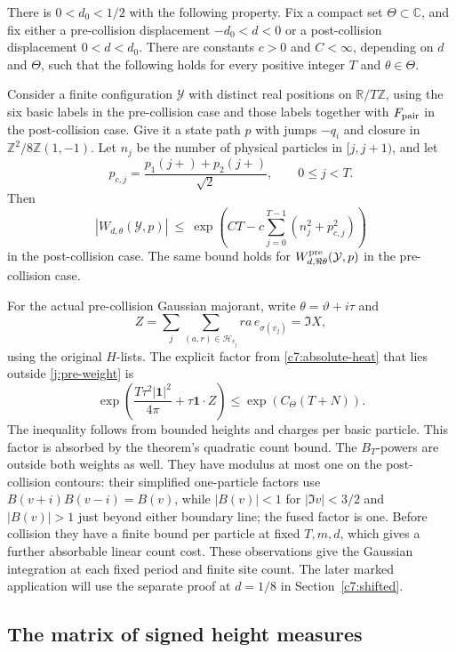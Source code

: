 \begin{theorem}\label{j:absolute-stability}
There is \(0<d_0<1/2\) with the following property. Fix a compact set \(\Theta\subset\mathbb C\), and fix either a pre-collision displacement \(-d_0<d<0\) or a post-collision displacement \(0<d<d_0\). There are constants \(c>0\) and \(C<\infty\), depending on \(d\) and \(\Theta\), such that the following holds for every positive integer \(T\) and \(\theta\in\Theta\).

Consider a finite configuration \(\mathcal Y\) with distinct real positions on \(\mathbb R/T\mathbb Z\), using the six basic labels in the pre-collision case and those labels together with \(F_{\rm pair}\) in the post-collision case. Give it a state path \(p\) with jumps \(-q_i\) and closure in \(\mathbb Z^2/8\mathbb Z(1,-1)\). Let \(n_j\) be the number of physical particles in \([j,j+1)\), and let
\[
p_{c,j}=\frac{p_1(j+)+p_2(j+)}{\sqrt2},
\qquad 0\le j<T.
\]
Then
\[
\left|W_{d,\theta}(\mathcal Y,p)\right|
\ \le\
\exp\!\left(CT-c\sum_{j=0}^{T-1}(n_j^2+p_{c,j}^2)\right)
\]
in the post-collision case. The same bound holds for \(W^{\rm pre}_{d,\Re\theta}(\mathcal Y,p)\) in the pre-collision case.
\end{theorem}

For the actual pre-collision Gaussian majorant, write \(\theta=\vartheta+i\tau\) and
\[
Z=\sum_j\sum_{(a,r)\in\mathscr H_{v_j}}ra\,e_{\sigma(v_j)}
=\Im X,
\]
using the original \(H\)-lists. The explicit factor from \eqref{c7:absolute-heat} that lies outside \eqref{j:pre-weight} is
\[
\exp\!\left(\frac{T\tau^2|\mathbf1|^2}{4\pi}
+\tau\mathbf1\cdot Z\right)
\le \exp(C_\Theta(T+N)).
\]
The inequality follows from bounded heights and charges per basic particle. This factor is absorbed by the theorem's quadratic count bound. The \(B_T\)-powers are outside both weights as well. They have modulus at most one on the post-collision contours: their simplified one-particle factors use \(B(v+i)B(v-i)=B(v)\), while \(|B(v)|<1\) for \(|\Im v|<3/2\) and \(|B(v)|>1\) just beyond either boundary line; the fused factor is one. Before collision they have a finite bound per particle at fixed \(T,m,d\), which gives a further absorbable linear count cost. These observations give the Gaussian integration at each fixed period and finite site count. The later marked application will use the separate proof at \(d=1/8\) in Section~\ref{c7:shifted}.

\subsection{The matrix of signed height measures}

